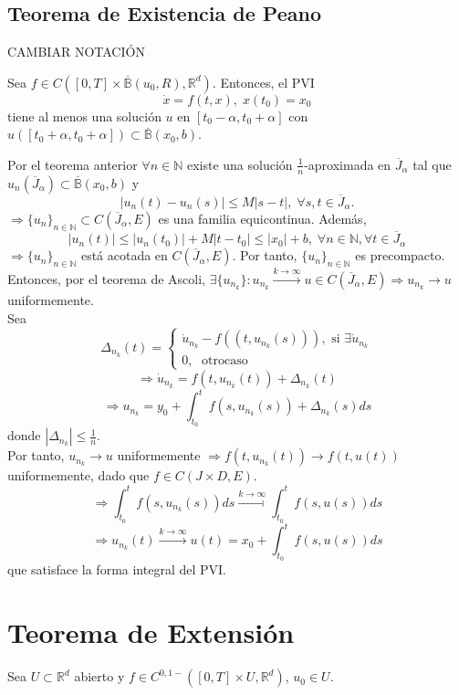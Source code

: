 \subsection{Teorema de Existencia de Peano}

CAMBIAR NOTACIÓN

\begin{theo}[Peano]
  Sea $f \in C([0,T] \times \overline{\mathbb{B}}(u_{0},R), \mathbb{R}^{d})$. Entonces, el PVI 
  \[ 
    \dot{x} = f(t,x), \; x(t_{0}) = x_{0} 
  \] 
  tiene al menos una solución $u$ en $[t_{0} - \alpha, t_{0} + \alpha]$ con $u([t_{0} + \alpha, t_{0} +\alpha]) \subset \overline{\mathbb{B}}(x_{0}, b)$.
\end{theo}

\begin{dem}
  Por el teorema anterior $\forall n \in \mathbb{N}$ existe una solución $\frac{1}{n}$-aproximada en $\overline{J}_{\alpha}$ tal que $u_{n}(\overline{J}_{\alpha}) \subset \overline{\mathbb{B}}(x_{0}, b)$ y
  \[ 
    | u_{n}(t) - u_{n}(s) | \leq M |  s - t | , \; \forall s,t \in \overline{J}_{\alpha}.
  \] 
  $ \Rightarrow \{ u_{n} \}_{n \in \mathbb{N}} \subset C(\overline{J}_{\alpha}, E)$ es una familia equicontinua. Además, 
  \[ 
    | u_{n}(t) | \leq | u_{n}(t_{0}) | + M | t - t_{0} | \leq | x_{0} | + b,\; \forall n \in \mathbb{N}, \forall t \in \overline{J}_{\alpha}
  \] 
  $ \Rightarrow \{ u_{n} \}_{n \in \mathbb{N}}$ está acotada en $C(\overline{J}_{\alpha}, E)$. Por tanto, $\{ u_{n} \}_{n \in \mathbb{N}}$ es precompacto. \\

  Entonces, por el teorema de Ascoli, $\exists \{ u_{n_{k}} \}: u_{n_{k}} \xrightarrow[]{ k \rightarrow \infty} u \in C(\overline{J}_{\alpha}, E) \Rightarrow u_{n_{k}} \rightarrow u$ uniformemente. \\

  Sea
  \[
    \Delta_{n_{k}}(t)  =
    \begin{cases}
      \dot{u}_{n_{k}} - f((t, u_{n_{k}}(s))), \text{ si } \exists \dot{u}_{n_{k}}\\
      0, \; \text{ otrocaso }
    \end{cases}
  \]
  \[ 
    \Rightarrow \dot{u}_{n_{k}} = f(t, u_{n_{k}}(t)) + \Delta_{n_{k}}(t)
  \] 
  \[ 
    \Rightarrow u_{n_{k}} = y_{0} + \int_{t_{0}}^{t} f(s, u_{n_{k}}(s)) + \Delta_{n_{k}}(s) ds
  \] 
  donde $| \Delta_{n_{k}} | \leq \frac{1}{n}$. \\

  Por tanto, $u_{n_{k}} \rightarrow u$ uniformemente $\Rightarrow f(t, u_{n_{k}}(t)) \rightarrow f(t, u(t))$ uniformemente, dado que $f \in C(J \times D, E)$.
  \[ 
    \Rightarrow \int_{t_{0}}^{t} f(s,u_{n_{k}}(s)) ds \xrightarrow[]{k \rightarrow \infty} \int_{t_{0}}^{t}  f(s, u(s)) ds
  \] 
  \[ 
    \Rightarrow  u_{n_{k}}(t) \xrightarrow[]{ k \rightarrow \infty } u(t) = x_{0} + \int_{t_{0}}^{t} f(s, u(s)) ds  
  \] 
  que satisface la forma integral del PVI.
\end{dem}

\section{Teorema de Extensión}

\begin{defn}
  Sea $U \subset \mathbb{R}^{d}$ abierto y $f \in C^{0,1-}([0, T] \times U, \mathbb{R}^{d})$, $u_{0} \in U$.
\end{defn}
